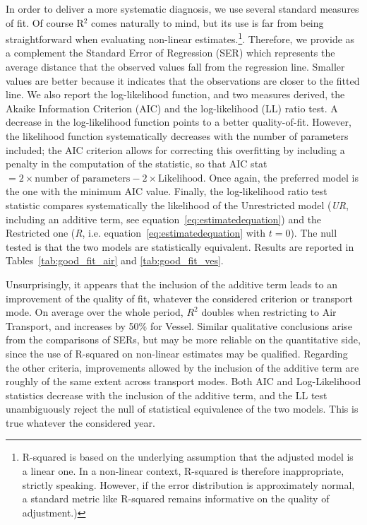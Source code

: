 \documentclass[a4paper,11pt]{article}
\begin{document}
In order to deliver a more systematic diagnosis, we use several standard measures of fit. Of course R$^{2}$ comes naturally to mind, but its use is far from being straightforward when evaluating non-linear estimates.\footnote{R-squared is based on the underlying assumption that the adjusted model is a linear one. In a non-linear context, R-squared is therefore inappropriate, strictly speaking. However, if the error distribution is approximately normal, a standard metric like R-squared remains informative on the quality of adjustment.)}. Therefore, we provide as a complement the Standard Error of Regression (SER) which represents the average distance that the observed values fall from the regression line. Smaller values are better because it indicates that the observations are closer to the fitted line. We also report the log-likelihood function, and two measures derived, the Akaike Information Criterion (AIC) and the log-likelihood (LL) ratio test. A decrease in the log-likelihood function points to a better quality-of-fit. However, the likelihood function systematically decreases with the number of parameters included; the AIC criterion allows for correcting this overfitting by including a penalty in the computation of the statistic, so that AIC stat $= 2 \times \textrm{number of parameters} - 2 \times \textrm{Likelihood} $. Once again, the preferred model is the one with the minimum AIC value. Finally, the log-likelihood ratio test statistic compares systematically the likelihood of the Unrestricted model (\emph{UR}, including an additive term, see equation~\ref{eq:estimatedequation}) and the Restricted one (\emph{R}, i.e. equation~\ref{eq:estimatedequation} with $t=0$). The null tested is that the two models are statistically equivalent. Results are reported in Tables~\ref{tab:good_fit_air} and \ref{tab:good_fit_ves}.



Unsurprisingly, it appears that the inclusion of the additive term leads to an improvement of the quality of fit, whatever the considered criterion or transport mode. On average over the whole period, $R^{2}$ doubles when restricting to Air Transport, and increases by 50\% for Vessel. Similar qualitative conclusions arise from the comparisons of SERs, but may be more reliable on the quantitative side, since the use of R-squared on non-linear estimates may be qualified. Regarding the other criteria, improvements allowed by the inclusion of the additive term are roughly of the same extent across transport modes. Both AIC and Log-Likelihood statistics decrease with the inclusion of the additive term, and the LL test unambiguously reject the null of statistical equivalence of the two models. This is true whatever the considered year.
\end{document}
